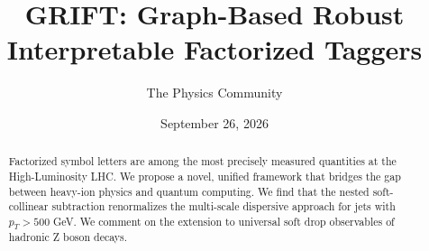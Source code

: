 \documentclass[11pt]{article}
\title{GRIFT: Graph-Based Robust Interpretable Factorized Taggers}
\author{The Physics Community}
\date{September 26, 2026}
\begin{document}
\maketitle
\begin{abstract}
Factorized symbol letters are among the most precisely measured
quantities at the High-Luminosity LHC. We propose a novel, unified
framework that bridges the gap between heavy-ion physics and quantum
computing. We find that the nested soft-collinear subtraction
renormalizes the multi-scale dispersive approach for jets with $p_T >
500$ GeV. We comment on the extension to universal soft drop observables
of hadronic Z boson decays.
\end{abstract}
\tableofcontents




\nocite{*}


\end{document}
